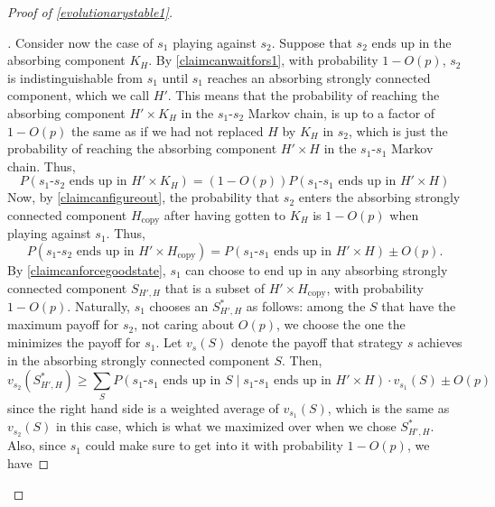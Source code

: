 \documentclass[12pt]{article}
\theoremstyle{definition}
\theoremstyle{remark}
\newenvironment{subproof}[1][\proofname]{%
  \renewcommand{\qedsymbol}{$\blacksquare$}%
  \begin{proof}[#1]%
}{%
  \end{proof}%
}
\begin{document}
\begin{proof}[Proof of \cref{evolutionarystable1}]
\begin{subproof}
        Consider now the case of $s_1$ playing against $s_2$. Suppose that $s_2$ ends up in the absorbing component $K_H$. By \cref{claimcanwaitfors1}, with probability $1 - O(p)$, $s_2$ is indistinguishable from $s_1$ until $s_1$ reaches an absorbing strongly connected component, which we call $H'$.         
        This means that the probability of reaching the absorbing component $H' \times K_H$ in the $s_1$-$s_2$ Markov chain, is up to a factor of $1 - O(p)$ the same as if we had not replaced $H$ by $K_H$ in $s_2$, which is just the probability of reaching the absorbing component $H' \times H$ in the $s_1$-$s_1$ Markov chain. Thus, 
        \begin{equation*}
          P(\text{$s_1$-$s_2$ ends up in $H' \times K_H$}) = (1 - O(p)) P(\text{$s_1$-$s_1$ ends up in $H' \times H$})
        \end{equation*}
        Now, by \cref{claimcanfigureout}, the probability that $s_2$ enters the absorbing strongly connected component $H_\text{copy}$ after having gotten to $K_H$ is $1 - O(p)$ when playing against $s_1$. Thus,
        \begin{equation}
          \label{equationhhcopy}
          P(\text{$s_1$-$s_2$ ends up in $H' \times H_\text{copy}$}) = P(\text{$s_1$-$s_1$ ends up in $H' \times H$}) \pm O(p).
        \end{equation}
        By \cref{claimcanforcegoodstate}, $s_1$ can choose to end up in any absorbing strongly connected component $S_{H', H}$ that is a subset of $H' \times H_\text{copy}$, with probability $1 - O(p)$. 
        Naturally, $s_1$ chooses an $S_{H', H}^*$ as follows: among the $S$ that have the maximum payoff for $s_2$, not caring about $O(p)$, we choose the one the minimizes the payoff for $s_1$.
        Let $v_{s}(S)$ denote the payoff that strategy $s$ achieves in the absorbing strongly connected component $S$. Then,
        \begin{equation}
          \label{imtoootired}
          v_{s_2}(S_{H', H}^*) \geq \sum_{S} P(\text{$s_1$-$s_1$ ends up in $S$} \mid \text{$s_1$-$s_1$ ends up in $H' \times H$}) \cdot v_{s_1}(S) \pm O(p)
        \end{equation}
        since the right hand side is a weighted average of $v_{s_1}(S)$, which is the same as $v_{s_2}(S)$ in this case, which is what we maximized over when we chose $S_{H', H}^*$. Also, since $s_1$ could make sure to get into it with probability $1 - O(p)$, we have 

\end{subproof}
\end{proof}
\end{document}
